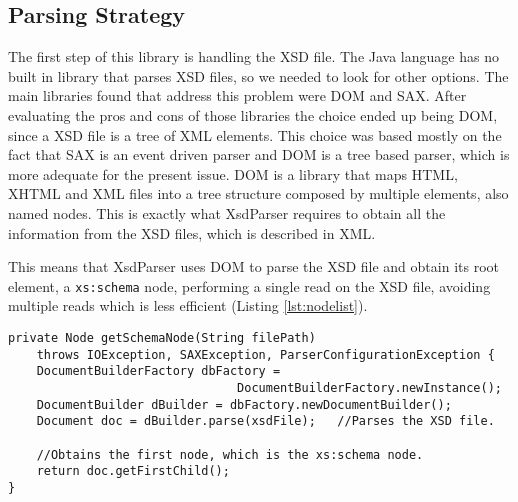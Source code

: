 \subsection{Parsing Strategy}
\label{sec:parsingstrategy}

The first step of this library is handling the \ac{XSD} file. The Java language has no built in library that parses \ac{XSD} files, so we needed to look for other options. The main libraries found that address this problem were \ac{DOM} and \ac{SAX}. After evaluating the pros and cons of those libraries the choice ended up being \ac{DOM}, since a \ac{XSD} file is a tree of \ac{XML} elements. This choice was based mostly on the fact that \ac{SAX} is an event driven parser and \ac{DOM} is a tree based parser, which is more adequate for the present issue. \ac{DOM} is a library that maps \ac{HTML}, \ac{XHTML} and \ac{XML} files into a tree structure composed by multiple elements, also named nodes. This is exactly what XsdParser requires to obtain all the information from the \ac{XSD} files, which is described in \ac{XML}. 

\noindent
This means that XsdParser uses \ac{DOM} to parse the \ac{XSD} file and obtain its root element, a \texttt{xs:schema} node, performing a single read on the \ac{XSD} file, avoiding multiple reads which is less efficient (Listing \ref{lst:nodelist}). 

\bigskip


\begin{minipage}{\linewidth}
\begin{lstlisting}[caption={DOM Document Parsing}, label={lst:nodelist}]
private Node getSchemaNode(String filePath) 
    throws IOException, SAXException, ParserConfigurationException {
    DocumentBuilderFactory dbFactory =                                                              
                                DocumentBuilderFactory.newInstance();
    DocumentBuilder dBuilder = dbFactory.newDocumentBuilder();
    Document doc = dBuilder.parse(xsdFile);   //Parses the XSD file.

    //Obtains the first node, which is the xs:schema node.
    return doc.getFirstChild();
}
\end{lstlisting}
\end{minipage}

